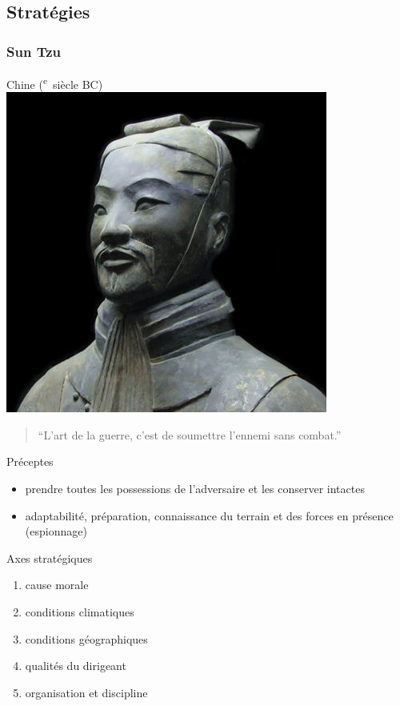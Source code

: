 \documentclass{article}
\newcommand{\cRM}[1]{\MakeUppercase{\romannumeral #1}}  %
\newcommand{\siecle}[1]{\cRM{#1}\textsuperscript{e}~siècle}
\begin{document}
\subsection{Stratégies}

\subsubsection{Sun Tzu}
Chine (\siecle{6} BC)
\includegraphics[]{../ressources/sun_tzu_general}
\begin{quote}“L'art de la guerre, c'est de soumettre l'ennemi sans combat.”\end{quote}

Préceptes
\begin{itemize}
\item prendre toutes les possessions de l'adversaire et les conserver intactes
\item adaptabilité, préparation, connaissance du terrain et des forces en présence (espionnage)
\end{itemize}
Axes stratégiques
\begin{enumerate}
\item cause morale
\item conditions climatiques
\item conditions géographiques
\item qualités du dirigeant
\item organisation et discipline
\end{enumerate}

\cite{tzu1997art, sun_tzu_fighting, sun_tzu_wiki}
\end{document}

